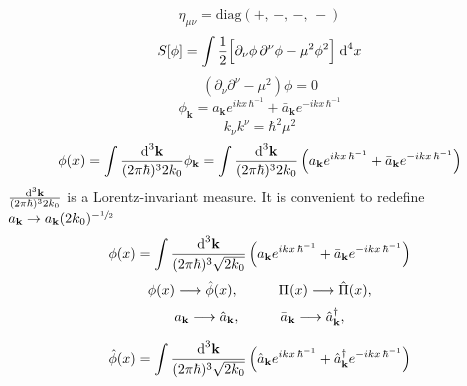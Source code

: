 \begin{equation}
	\eta_{\mu\nu}=\text{diag}\left(+,\,-,\,-,\,-\right)
\end{equation}
\begin{equation}\label{eq: Minkowski scalar action}
	S[\phi]=\int\frac{1}{2}\Big[\partial_\nu\phi\,\partial^\nu\phi-\mu^2\phi^2\Big]\;\text{d}^4 x
\end{equation}
\begin{equation}
	\left(\partial_\nu\partial^\nu-\mu^2\right)\phi=0
\end{equation}
\begin{equation}
	\phi_\mathbf{k}=a_\mathbf{k}e^{ikx\,\hbar^{-1}}+\bar a_\mathbf{k}e^{-ikx\,\hbar^{-1}}
\end{equation}
\begin{equation}
	k_\nu k^\nu=\hbar^2\mu^2
\end{equation}
\begin{equation}
	\phi(x)=\int\frac{\text{d}^3\mathbf{k}}{(2\pi\hbar)^32k_0}\phi_{\mathbf{k}}=\int\frac{\text{d}^3\mathbf{k}}{(2\pi\hbar)^32k_0}\left(a_\mathbf{k}e^{ikx\,\hbar^{-1}}+\bar a_\mathbf{k}e^{-ikx\,\hbar^{-1}}\right)
\end{equation}
$\frac{\text{d}^3\mathbf{k}}{(2\pi\hbar)^32k_0}$ is a Lorentz-invariant measure. It is convenient to redefine $a_\mathbf{k}\to a_\mathbf{k}(2k_0)^{-\sfrac{1}{2}}$
\begin{equation}
	\phi(x)=\int\frac{\text{d}^3\mathbf{k}}{(2\pi\hbar)^3\sqrt{2k_0}}\left(a_\mathbf{k}e^{ikx\,\hbar^{-1}}+\bar a_\mathbf{k}e^{-ikx\,\hbar^{-1}}\right)
\end{equation}
\begin{equation*}
	\phi(x)\longrightarrow\hat{\phi}(x),\hspace{1.0cm}\Pi(x)\longrightarrow\hat{\Pi}(x),
\end{equation*}
\begin{equation*}
	a_\mathbf{k}\longrightarrow\hat{a}_\mathbf{k},\hspace{1.0cm}\bar a_\mathbf{k}\longrightarrow\hat{a}_\mathbf{k}^\dagger,
\end{equation*}

\begin{equation}
	\hat\phi(x)=\int\frac{\text{d}^3\mathbf{k}}{(2\pi\hbar)^3\sqrt{2k_0}}\left(\hat a_\mathbf{k}e^{ikx\,\hbar^{-1}}+ \hat a_\mathbf{k}^\dagger e^{-ikx\,\hbar^{-1}}\right)
\end{equation}

